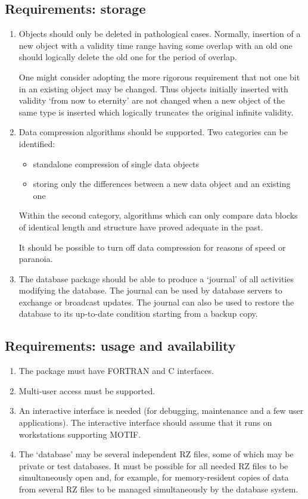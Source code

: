 \subsection{Requirements: storage}
\begin{enumerate}
\item
Objects should only be deleted in pathological cases.  Normally,
 insertion of a
new object with a validity time range having some overlap with an old one
should logically delete the old one for the period of overlap.

One might consider adopting
the more rigorous requirement that not one bit in an existing
object may be changed.  Thus objects initially inserted with validity `from now
to eternity' are not changed when a new object of the same type is inserted which
logically truncates the original infinite validity.

\item
Data compression algorithms should be supported.
Two categories can be identified:
\begin{itemize}
\item
standalone compression of single data objects
\item
storing only the differences between a new data object and an existing one
\end{itemize}
Within the second category, algorithms which can only compare data blocks of
identical length and structure have proved adequate in the past.

It should be possible to turn off data compression for reasons of speed or paranoia.

\item
The database package should be able to produce a `journal' of all activities
modifying the database.  The journal can be used by database servers to exchange
or broadcast updates.  The journal can also be used to restore the database to
its up-to-date condition starting from a backup copy.
\end{enumerate}

\subsection{Requirements: usage and availability}
\begin{enumerate}
\item
The package must have FORTRAN and C interfaces.
\item
Multi-user access must be supported.
\item
An interactive interface is needed (for debugging, maintenance and a few user applications).
The interactive interface should assume that it runs on workstations supporting MOTIF.

\item
The `database' may be several independent RZ files, some of which may be private
or test databases.  It must be possible for all needed RZ files to be simultaneously
open and, for example, for memory-resident copies of data from several RZ files to
be managed simultaneously by the database system.
\end{enumerate}


